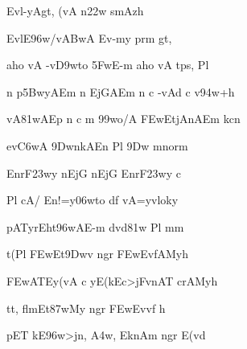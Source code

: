 {\dn Evl-yAg\5t, (vA n\0\322w\2 smAzh \vegdn\dontdisplaylinenum}

{\dn EvlE\396w/v\3ABwA Ev-my\2 prm\2 gt,{\dandabdn} \dontdisplaylinenum}

{\dn aho vA -v\3D9wto \35FwE-m aho vA tps, Pl \vegdn\dontdisplaylinenum}

{\dn n p\35BwyAEm n EjG\5AEm n c -vAd\2 c v\?\394w+h \dontdisplaylinenum}

{\dn vA\381wA\0Ep n c m\? \399wo/A \3FEwEtjAnAEm k\2cn \vegdn\dontdisplaylinenum}

{\dn ev\3C6wA \39Dwn\?kAEn Pl\2 \39Dw mnorm \dontdisplaylinenum}

{\dn {}EnrF\323wy nEj\0G\5\2 nEj\0G\5\2 EnrF\323wy c \vegdn\dontdisplaylinenum}

{\dn Pl\2 cA/ En!=y\306wto d\?f\2 vA=yvloky \dontdisplaylinenum}

{\dn pAT\?yrEht\396wAE-m d\?vd\381w\2 Pl\2 mm \vegdn\dontdisplaylinenum}

{\dn t(Pl\2 \3FEwEt\39Dw\4v ngr\2 \3FEwEvfAMyh \dontdisplaylinenum}

{\dn \3FEwAT\0Ey(vA c yE(k\2Ec>jFvnAT{\rdt} crAMyh \vegdn\dontdisplaylinenum}

{\dn tt, f\4lmEt\387wMy ngr\2 \3FEwEvv\?f h{\dandabdn} \dontdisplaylinenum}

{\dn pET kE\396w>jn, \3A4w, Ek\2nAm ngr\2 E(vd \vegdn\dontdisplaylinenum}

